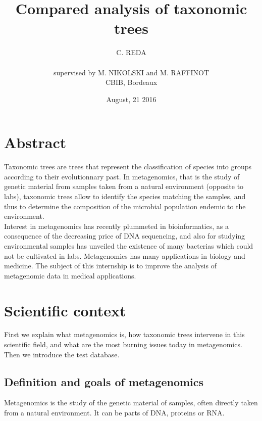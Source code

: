 \documentclass{report}
\title{Compared analysis of taxonomic trees}
\author{C. REDA \\ \\ supervised by M. NIKOLSKI and M. RAFFINOT\\CBIB, Bordeaux}
\date{August, 21 2016}
\begin{document}
\maketitle
{}

\chapter*{Abstract}
\nocite{*}
Taxonomic trees are trees that represent the classification of species into groups according to their evolutionnary past. In metagenomics, that is the study of genetic material from samples taken from a natural environment (opposite to labs), taxonomic trees allow to identify the species matching the samples, and thus to determine the composition of the microbial population endemic to the environment.\\

Interest in metagenomics has recently plummeted in bioinformatics, as a consequence of the decreasing price of DNA sequencing, and also for studying environmental samples has unveiled the existence of many bacterias which could not be cultivated in labs. Metagenomics has many applications in biology and medicine. The subject of this internship is to improve the analysis of metagenomic data in medical applications.\\

\newpage
 
\tableofcontents
 
\newpage

\listoffigures

\newpage

\listoftables

\newpage
 

\xpatchcmd{\chapter}{%
  \thispagestyle{plain}%
}{%
  \pagestyle{mystyle}
}{}{}

\chapter{Scientific context}

First we explain what metagenomics is, how taxonomic trees intervene in this scientific field, and what are the most burning issues today in metagenomics. Then we introduce the test database.

\section{Definition and goals of metagenomics}
Metagenomics is the study of the genetic material of samples, often directly taken from a natural environment. It can be parts of DNA, proteins or RNA.\\
\end{document}
